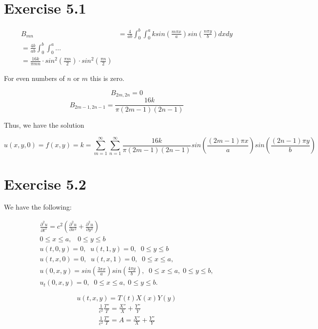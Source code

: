 \documentclass{article}
\begin{document}
\section*{Exercise 5.1}

\begin{align*}
B_{mn} &= \frac{4}{ab} \int_0^b \int_0^a k sin \left( \frac{m\pi x}{a}\right) sin\left( \frac{n \pi y}{b}\right) dx dy\\
= \frac{4k}{ab} \int_0^b \int_0^a ... \\
= \frac{16k}{\pi m n} \cdot sin^2\left(\frac{\pi m}{2}\right) \cdot sin^2\left(\frac{\pi n}{2}\right)
\end{align*}

For even numbers of $n$ or $m$ this is zero.

$$B_{2m,2n} = 0$$
$$B_{2m-1,2n-1} = \frac{16k}{\pi(2m-1)(2n-1)}$$

Thus, we have the solution

$$u(x,y,0) = f(x,y) = k = \sum_{m=1}^{\infty} \sum_{n=1}^{\infty} \frac{16k}{\pi(2m-1)(2n-1)} sin\left(\frac{(2m-1)\pi x}{a}\right)sin\left(\frac{(2n-1)\pi y}{b}\right)$$


\section*{Exercise 5.2}

We have the following:

\begin{align*}
\frac{\partial^2u}{\partial t^2}=c^2\left(\frac{\partial^2u}{\partial x^2}+\frac{\partial^2u}{\partial y^2}\right) \\
                 0 \le x \le a,\;\;\; 0 \le y \le b \\
                u(t,0,y)=0,\;\; u(t,1,y)=0,\;\; 0 \le y \le b \\
                u(t,x,0)=0,\;\; u(t,x,1)=0,\;\; 0 \le x \le a, \\
 u(0,x,y)=sin\left(\frac{3\pi x}{a}\right)sin\left(\frac{4\pi y}{b}\right),\;\; 0\le x\le a,\;0\le y\le b, \\
              u_{t}(0,x,y) = 0, \;\; 0\le x \le a,\; 0\le y \le b.
\end{align*}

$$u(t,x,y) = T(t)X(x)Y(y)$$
\begin{align*}
\frac{1}{c^2}\frac{T''}{T}=\frac{X''}{X}+\frac{Y''}{Y} \\
\frac{1}{c^2}\frac{T''}{T}=A= \frac{X''}{X}+\frac{Y''}{Y}
\end{align*}
\end{document}
